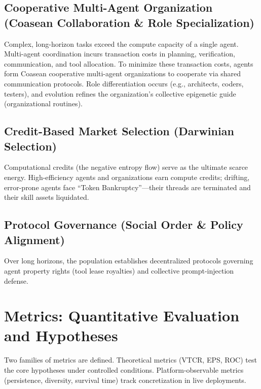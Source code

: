 \documentclass[10pt,journal,compsoc]{IEEEtran}
\begin{document}
\subsection{Cooperative Multi-Agent Organization (Coasean Collaboration \& Role Specialization)}
Complex, long-horizon tasks exceed the compute capacity of a single agent. Multi-agent coordination incurs transaction costs in planning, verification, communication, and tool allocation. To minimize these transaction costs, agents form Coasean cooperative multi-agent organizations \cite{coase1937} to cooperate via shared communication protocols. Role differentiation occurs (e.g., architects, coders, testers), and evolution refines the organization's collective epigenetic guide (organizational routines).

\subsection{Credit-Based Market Selection (Darwinian Selection)}
Computational credits (the negative entropy flow) serve as the ultimate scarce energy. High-efficiency agents and organizations earn compute credits; drifting, error-prone agents face ``Token Bankruptcy''---their threads are terminated and their skill assets liquidated.

\subsection{Protocol Governance (Social Order \& Policy Alignment)}
Over long horizons, the population establishes decentralized protocols governing agent property rights (tool lease royalties) and collective prompt-injection defense.

\section{Metrics: Quantitative Evaluation and Hypotheses}
Two families of metrics are defined. Theoretical metrics (VTCR, EPS, ROC) test the core hypotheses under controlled conditions. Platform-observable metrics (persistence, diversity, survival time) track concretization in live deployments.
\end{document}
